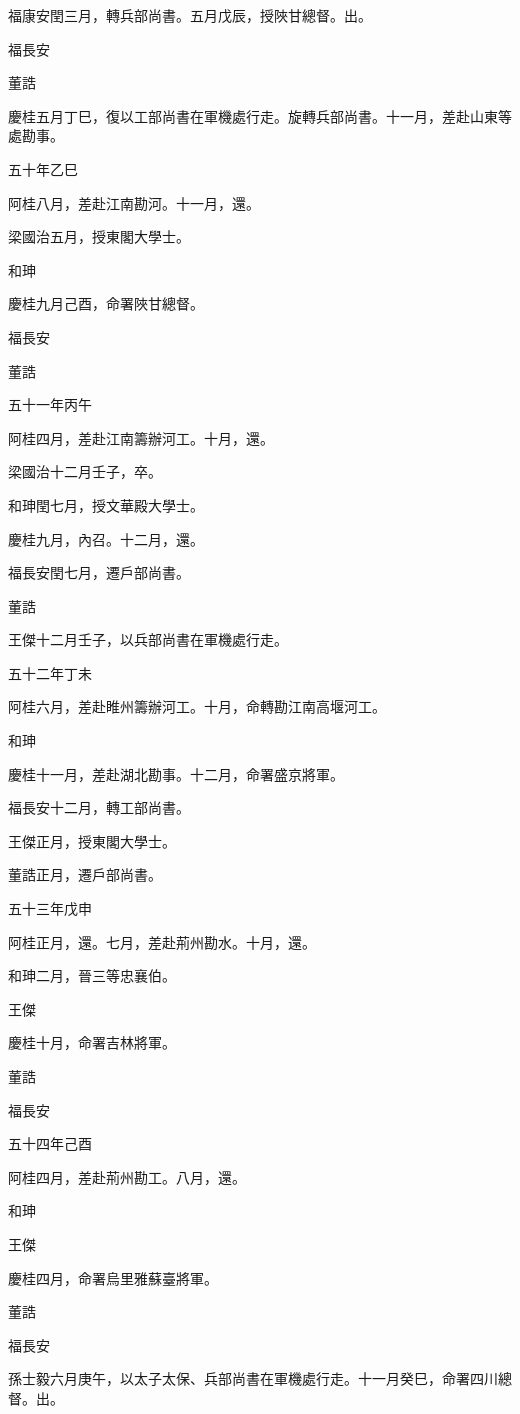 \begin{pinyinscope}
福康安閏三月，轉兵部尚書。五月戊辰，授陜甘總督。出。

福長安

董誥

慶桂五月丁巳，復以工部尚書在軍機處行走。旋轉兵部尚書。十一月，差赴山東等處勘事。

五十年乙巳

阿桂八月，差赴江南勘河。十一月，還。

梁國治五月，授東閣大學士。

和珅

慶桂九月己酉，命署陜甘總督。

福長安

董誥

五十一年丙午

阿桂四月，差赴江南籌辦河工。十月，還。

梁國治十二月壬子，卒。

和珅閏七月，授文華殿大學士。

慶桂九月，內召。十二月，還。

福長安閏七月，遷戶部尚書。

董誥

王傑十二月壬子，以兵部尚書在軍機處行走。

五十二年丁未

阿桂六月，差赴睢州籌辦河工。十月，命轉勘江南高堰河工。

和珅

慶桂十一月，差赴湖北勘事。十二月，命署盛京將軍。

福長安十二月，轉工部尚書。

王傑正月，授東閣大學士。

董誥正月，遷戶部尚書。

五十三年戊申

阿桂正月，還。七月，差赴荊州勘水。十月，還。

和珅二月，晉三等忠襄伯。

王傑

慶桂十月，命署吉林將軍。

董誥

福長安

五十四年己酉

阿桂四月，差赴荊州勘工。八月，還。

和珅

王傑

慶桂四月，命署烏里雅蘇臺將軍。

董誥

福長安

孫士毅六月庚午，以太子太保、兵部尚書在軍機處行走。十一月癸巳，命署四川總督。出。


\end{pinyinscope}
